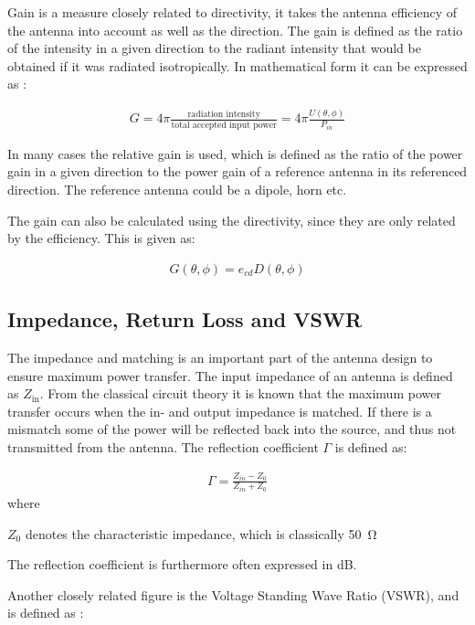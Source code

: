 Gain is a measure closely related to directivity, it takes the antenna efficiency of the antenna into account as well as the direction. The gain is defined as the ratio of the intensity in a given direction to the radiant intensity that would be obtained if it was radiated isotropically. In mathematical form it can be expressed as \cite{}:

\begin{align}
  G = 4 \pi \frac{\text{radiation intensity}}{\text{total accepted input power}} = 4 \pi \frac{U(\theta,\phi)}{P_{in}}
\end{align}

In many cases the relative gain is used, which is defined as the ratio of the power gain in a given direction to the power gain of a reference antenna in its referenced direction. The reference antenna could be a dipole, horn etc. 

The gain can also be calculated using the directivity, since they are only related by the efficiency. This is given as: \cite{}

\begin{align}
  G(\theta,\phi) = e_{cd}D(\theta, \phi) 
\end{align}

\subsection{Impedance, Return Loss and VSWR}
The impedance and matching is an important part of the antenna design to ensure maximum power transfer. The input impedance of an antenna is defined as $Z_{\text{in}}$. From the classical circuit theory it is known that the maximum power transfer occurs when the in- and output impedance is matched. If there is a mismatch some of the power will be reflected back into the source, and thus not transmitted from the antenna. The reflection coefficient $\Gamma$ is defined as: \cite{}

\begin{align}
  \Gamma = \frac{Z_{in}-Z_0}{Z_{in}+Z_0} 
\end{align}
where
\begin{where}
\item[$Z_0$] denotes the characteristic impedance, which is classically \SI{50}{\ohm}
\end{where}
The reflection coefficient is furthermore often expressed in \si{dB}. 

Another closely related figure is the Voltage Standing Wave Ratio (VSWR), and is defined as \cite{}: 

